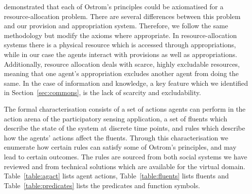  demonstrated that each of Ostrom's principles could be axiomatised for a resource-allocation problem. There are several differences between this problem and our provision and appropriation system. 
Therefore, we follow the same methodology but modify the axioms where appropriate. 
In resource-allocation systems there is a physical resource which is accessed through appropriations, while in our case the agents interact with provisions as well as appropriations. 
Additionally, resource allocation deals with scarce, highly excludable resources, meaning that  one agent's appropriation excludes another agent from doing the same. 
In the case of information and knowledge, a key feature which we identified in Section~\ref{sec:commons}, is the lack of scarcity and excludability. 

The formal characterisation consists of a set of actions agents can perform in the action arena of the participatory sensing application, a set of fluents which describe the state of the system at discrete time points, and rules which describe how the agents' actions affect the fluents. Through this characterisation we enumerate how certain rules can satisfy some of Ostrom's principles, and may lead to certain outcomes. The rules are sourced from both social systems we have reviewed and from technical solutions which are available for the virtual domain. Table~\ref{table:agact} lists agent actions, Table~\ref{table:fluents} lists fluents and Table~\ref{table:predicates} lists the
predicates and function symbols.


